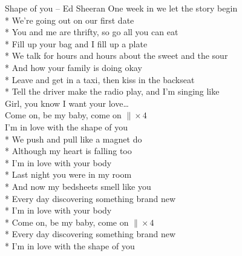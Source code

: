 \begin{piosenka_dluga}{Shape of you -- Ed Sheeran}
One week in we let the story begin \\*
We're going out on our first date \\*
You and me are thrifty, so go all you can eat \\*
Fill up your bag and I fill up a plate \\*
We talk for hours and hours about the sweet and the sour \\*
And how your family is doing okay \\*
Leave and get in a taxi, then kiss in the backseat \\*
Tell the driver make the radio play, and I'm singing like \\[\zwrotkaspace]

 Girl, you know I want your love\ldots \\[\zwrotkaspace]

Come on, be my baby, come on $\| \times 4$ \\[\zwrotkaspace]

I'm in love with the shape of you \\*
We push and pull like a magnet do \\*
Although my heart is falling too \\*
I'm in love with your body \\*
Last night you were in my room \\*
And now my bedsheets smell like you \\*
Every day discovering something brand new \\*
I'm in love with your body \\*
Come on, be my baby, come on $\| \times 4$ \\*
Every day discovering something brand new \\*
I'm in love with the shape of you \\[\zwrotkaspace]

\end{piosenka_dluga}